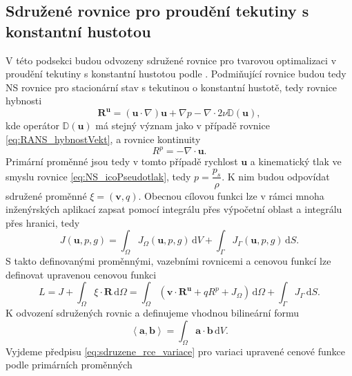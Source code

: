\subsection{Sdružené rovnice pro proudění tekutiny s konstantní hustotou} \label{sec:adjoint_rce}

V této podsekci budou odvozeny sdružené rovnice pro tvarovou optimalizaci v proudění tekutiny s konstantní hustotou podle \cite{papadimitriou2007continuous, furst2020mko2}. Podmiňující rovnice budou tedy NS rovnice pro stacionární stav s tekutinou o konstantní hustotě, tedy rovnice hybnosti
\begin{equation}\label{eq:rce_hybnosti}
\mathbf{R^u}=\left(\mathbf{u}\cdot\nabla\right)\mathbf{u} + \nabla p - \nabla \cdot 2 \nu \mathbb{D}(\mathbf{u}),
\end{equation}
kde operátor $ \mathbb{D}(\mathbf{u}) $ má stejný význam jako v případě rovnice \ref{eq:RANS_hybnostVekt}, a rovnice kontinuity
\begin{equation}
R^p=-\nabla \cdot \mathbf{u}.
\end{equation}\label{eq:rce_kontinuity}
Primární proměnné jsou tedy v tomto případě rychlost $ \mathbf{u} $ a kinematický tlak ve smyslu rovnice \ref{eq:NS_icoPseudotlak}, tedy $ p = \dfrac{p_{s}}{\rho}$. K nim budou odpovídat sdružené proměnné $ \xi = (\mathbf{v},q) $. Obecnou cílovou funkci lze v rámci mnoha inženýrských aplikací zapsat pomocí integrálu přes výpočetní oblast a integrálu přes hranici, tedy
\begin{equation}\label{eq:cenova_fce}
J(\mathbf{u},p,g)=\int_{\Omega} J_\Omega(\mathbf{u},p,g) \, \mathrm{d}V + \int_{\Gamma}J_\Gamma(\mathbf{u},p,g) \, \mathrm{d}S.
\end{equation}
S takto definovanými proměnnými, vazebními rovnicemi a cenovou funkcí lze definovat upravenou cenovou funkci
\begin{equation}
L= J + \int_\Omega \xi \cdot \mathbf{R} \,\mathrm{d}\Omega 
= \int_\Omega \left(\mathbf{v}\cdot\mathbf{R^u}+ q R^p +J_\Omega\right)  \,\mathrm{d}\Omega + \int_{\Gamma}J_\Gamma \, \mathrm{d}S.
\end{equation}
K odvození sdružených rovnic a definujeme vhodnou bilineární formu 
\begin{equation}
\left\langle \mathbf{a},\mathbf{b} \right\rangle = \int_{\Omega} \mathbf{a} \cdot \mathbf{b} \, \mathrm{d}V.
\end{equation} 
Vyjdeme předpisu \ref{eq:sdruzene_rce_variace} pro variaci upravené cenové funkce podle primárních proměnných
